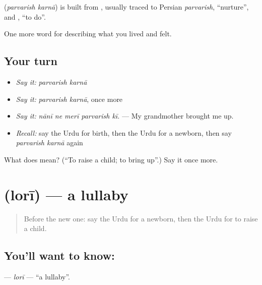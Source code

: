 \begin{cousinweb}
\textbf{ } (\emph{parvarish karnā}) is built from \textbf{}, usually traced to Persian \emph{parvarish}, \textquotedblleft{}nurture\textquotedblright{}, and \textbf{}, \textquotedblleft{}to do\textquotedblright{}.
\end{cousinweb}

\begin{grammarlens}[title={What you've built}]
One more word for describing what you lived and felt.
\end{grammarlens}

\subsection*{Your turn}
\begin{itemize}
\raggedright
  \item \emph{Say it:} \emph{parvarish karnā}
  \item \emph{Say it:} \emph{parvarish karnā}, once more
  \item \emph{Say it:} \emph{nānī ne merī parvarish kī.} — My grandmother brought me up.
  \item \emph{Recall:} say the Urdu for birth, then the Urdu for a newborn, then say \emph{parvarish karnā} again
\end{itemize}

\begin{tcolorbox}[breakable,colback=teal!4,colframe=teal!35!black,title={Before you move on}]
What does   mean? (\textquotedblleft{}To raise a child; to bring up\textquotedblright{}.) Say it once more.
\end{tcolorbox}
\section[\texorpdfstring{\ur{لوری} (lorī)}{لوری (lorī)}]{ (lorī) — a lullaby}

\label{lesson:UR-C484-lori}



\begin{quote}
Before the new one: say the Urdu for a newborn, then the Urdu for to raise a child.
\end{quote}

\subsection*{You'll want to know: }
\textbf{} — \emph{lorī} — \textquotedblleft{}a lullaby\textquotedblright{}.

